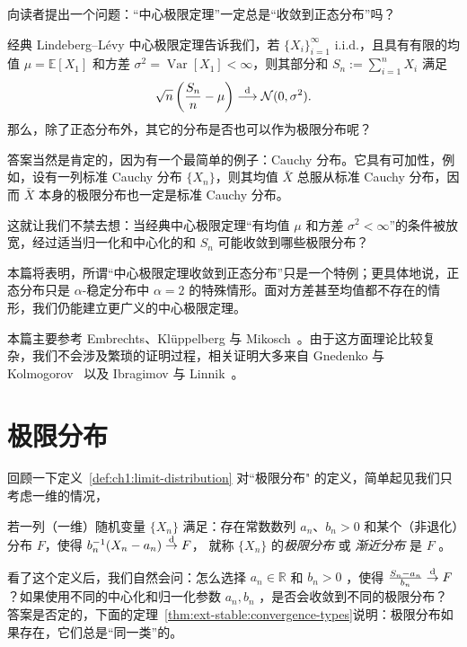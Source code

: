 向读者提出一个问题：“中心极限定理”一定总是“收敛到正态分布”吗？

经典 Lindeberg--L\'evy 中心极限定理告诉我们，若 $\{X_i\}_{i=1}^\infty$ i.i.d.，且具有有限的均值 $\mu=\mathbb E[X_1]$ 和方差 $\sigma^2=\operatorname{Var}[X_1]<\infty$，则其部分和 $S_n:=\sum_{i=1}^nX_i$ 满足
\[
\sqrt n\left(\frac{S_n}{n}-\mu\right)
\overset{\rm d}\longrightarrow\mathcal N(0,\sigma^2).
\]
那么，除了正态分布外，其它的分布是否也可以作为极限分布呢？

答案当然是肯定的，因为有一个最简单的例子：Cauchy 分布。它具有可加性，例如，设有一列标准 Cauchy 分布 $\{X_n\}$，则其均值 $\bar X$ 总服从标准 Cauchy 分布，因而 $\bar X$ 本身的极限分布也一定是标准 Cauchy 分布。

这就让我们不禁去想：当经典中心极限定理“有均值 $\mu$ 和方差 $\sigma^2<\infty$”的条件被放宽，经过适当归一化和中心化的和 $S_n$ 可能收敛到哪些极限分布？

本篇将表明，所谓“中心极限定理收敛到正态分布”只是一个特例；更具体地说，正态分布只是 $\alpha$-稳定分布中 $\alpha=2$ 的特殊情形。面对方差甚至均值都不存在的情形，我们仍能建立更广义的中心极限定理。

本篇主要参考 Embrechts、Kl\"uppelberg 与 Mikosch~\cite[第 2.2 节]{embrechts1997}。由于这方面理论比较复杂，我们不会涉及繁琐的证明过程，相关证明大多来自 Gnedenko 与 Kolmogorov~\cite{gnedenko1954} 以及 Ibragimov 与 Linnik~\cite{ibragimov1971}。

\section{极限分布}
回顾一下定义~\ref{def:ch1:limit-distribution} 对``极限分布" 的定义，简单起见我们只考虑一维的情况，
\begin{definition*}[极限分布]
若一列（一维）随机变量 $\{X_n\}$ 满足：存在常数数列 $a_n$、$b_n>0$ 和某个（非退化）分布 $F$，使得 $b_n^{-1}(X_n-a_n)\overset{\rm d}\to F$，
就称 $\{X_n\}$ 的\emph{极限分布} 或 \emph{渐近分布 }是 $F$ 。
\end{definition*}


看了这个定义后，我们自然会问：怎么选择 $a_n\in\mathbb R$ 和 $b_n>0$ ，使得 $\frac{S_n-a_n}{b_n}\overset{\rm d}\to F$ ？如果使用不同的中心化和归一化参数 $a_n,b_n$ ，是否会收敛到不同的极限分布？答案是否定的，下面的定理~\ref{thm:ext-stable:convergence-types}说明：极限分布如果存在，它们总是``同一类''的。

